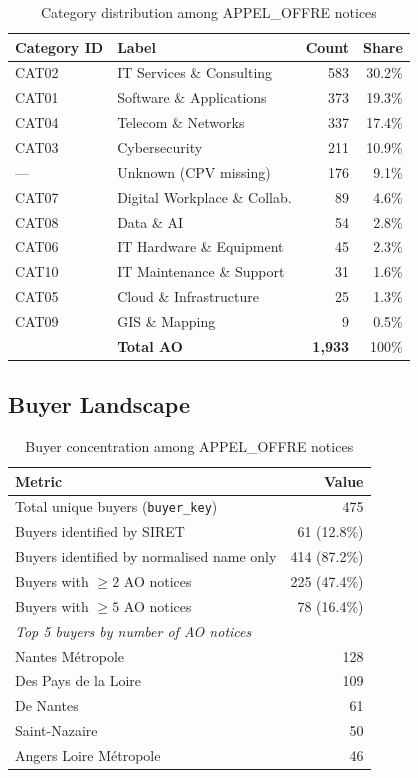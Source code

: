 \documentclass[12pt, a4paper]{article}
\begin{document}
\begin{table}[h]
\centering
\caption{Category distribution among APPEL\_OFFRE notices}
\label{tab:categories}
\begin{tabular}{llrr}
\toprule
Category ID & Label & Count & Share \\
\midrule
CAT02 & IT Services \& Consulting     & 583 & 30.2\% \\
CAT01 & Software \& Applications      & 373 & 19.3\% \\
CAT04 & Telecom \& Networks           & 337 & 17.4\% \\
CAT03 & Cybersecurity                 & 211 & 10.9\% \\
---   & Unknown (CPV missing)         & 176 &  9.1\% \\
CAT07 & Digital Workplace \& Collab.  &  89 &  4.6\% \\
CAT08 & Data \& AI                    &  54 &  2.8\% \\
CAT06 & IT Hardware \& Equipment      &  45 &  2.3\% \\
CAT10 & IT Maintenance \& Support     &  31 &  1.6\% \\
CAT05 & Cloud \& Infrastructure       &  25 &  1.3\% \\
CAT09 & GIS \& Mapping                &   9 &  0.5\% \\
\midrule
      & \textbf{Total AO}             & \textbf{1,933} & 100\% \\
\bottomrule
\end{tabular}
\end{table}

\subsection{Buyer Landscape}

\begin{table}[h]
\centering
\caption{Buyer concentration among APPEL\_OFFRE notices}
\begin{tabular}{lr}
\toprule
Metric & Value \\
\midrule
Total unique buyers (\texttt{buyer\_key}) & 475 \\
Buyers identified by SIRET & 61 (12.8\%) \\
Buyers identified by normalised name only & 414 (87.2\%) \\
Buyers with $\geq 2$ AO notices & 225 (47.4\%) \\
Buyers with $\geq 5$ AO notices & 78 (16.4\%) \\
\midrule
\multicolumn{2}{l}{\textit{Top 5 buyers by number of AO notices}} \\
Nantes M\'etropole        & 128 \\
Des Pays de la Loire      & 109 \\
De Nantes                 &  61 \\
Saint-Nazaire             &  50 \\
Angers Loire M\'etropole  &  46 \\
\bottomrule
\end{tabular}
\end{table}
\end{document}
